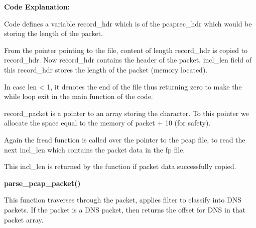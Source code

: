\documentclass[12pt, a4paper]{report}
\begin{document}
\textbf{Code Explanation: }

Code defines a variable record\_hdr which is of the pcaprec\_hdr which would be storing the length of the packet.

From the pointer pointing to the file, content of length record\_hdr is copied to record\_hdr. Now record\_hdr contains the header of the packet. incl\_len field of this record\_hdr stores the length of the packet (memory located).

In case len < 1, it denotes the end of the file thus returning zero to make the while loop exit in the main function of the code.

record\_packet is a pointer to an array storing the character. To this pointer we allocate the space equal to the memory of packet + 10 (for safety).

Again the fread function is called over the pointer to the pcap file, to read the next incl\_len which contains the packet data in the fp file.

This incl\_len is returned by the function if packet data successfully copied.

\textbf{parse\_pcap\_packet()}

This function traverses through the packet, applies filter to classify into DNS packets. If the packet is a DNS packet, then returns the offset for DNS in that packet array.
\end{document}
